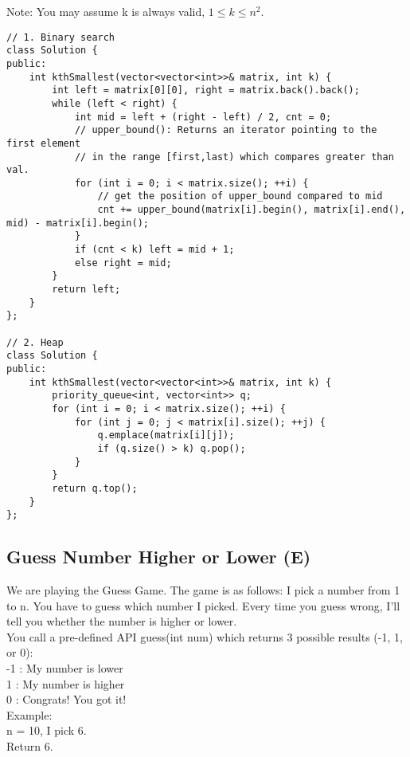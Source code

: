 Note:
You may assume k is always valid, $1 \leq k \leq n^2$.\\

\begin{lstlisting}
// 1. Binary search
class Solution {
public:
    int kthSmallest(vector<vector<int>>& matrix, int k) {
        int left = matrix[0][0], right = matrix.back().back();
        while (left < right) {
            int mid = left + (right - left) / 2, cnt = 0;
            // upper_bound(): Returns an iterator pointing to the first element 
            // in the range [first,last) which compares greater than val.
            for (int i = 0; i < matrix.size(); ++i) {
                // get the position of upper_bound compared to mid
                cnt += upper_bound(matrix[i].begin(), matrix[i].end(), mid) - matrix[i].begin();
            }
            if (cnt < k) left = mid + 1;
            else right = mid;
        }
        return left;
    }
};

// 2. Heap
class Solution {
public:
    int kthSmallest(vector<vector<int>>& matrix, int k) {
        priority_queue<int, vector<int>> q;
        for (int i = 0; i < matrix.size(); ++i) {
            for (int j = 0; j < matrix[i].size(); ++j) {
                q.emplace(matrix[i][j]);
                if (q.size() > k) q.pop();
            }
        }
        return q.top();
    }
};
\end{lstlisting}


\subsection{Guess Number Higher or Lower (E)}
We are playing the Guess Game. The game is as follows: I pick a number from 1 to n. You have to guess which number I picked. Every time you guess wrong, I'll tell you whether the number is higher or lower.\\

You call a pre-defined API guess(int num) which returns 3 possible results (-1, 1, or 0):\\
-1 : My number is lower\\ 
 1 : My number is higher\\
 0 : Congrats! You got it!\\

Example:\\
n = 10, I pick 6.\\
Return 6.\\

